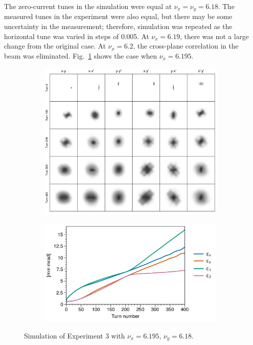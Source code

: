 The zero-current tunes in the simulation were equal at $\nu_x = \nu_y = 6.18$. The measured tunes in the experiment were also equal, but there may be some uncertainty in the measurement; therefore, simulation was repeated as the horizontal tune was varied in steps of 0.005. At $\nu_x = 6.19$, there was not a large change from the original case. At $\nu_x = 6.2$, the cross-plane correlation in the beam was eliminated. Fig.~\ref{fig:exp3_sim_nux6.195_nuy6.18} shows the case when $\nu_x = 6.195$. 
%
\begin{figure}[!p]
    \centering
    \begin{subfigure}{0.85\textwidth}
        \includegraphics[width=\textwidth]{Images/chapter5/exp3/sim_snapshots_nux6.195_nuy6.18.png}
    \end{subfigure}
    \vfill
    \vspace*{1.0cm}
    \vfill
    \begin{subfigure}{0.7\textwidth}
        \includegraphics[width=\textwidth]{Images/chapter5/exp3/sim_emittances_nux6.195_nuy6.18.png}
    \end{subfigure}
    \caption{Simulation of Experiment 3 with $\nu_x = 6.195$, $\nu_y = 6.18$.}
    \label{fig:exp3_sim_nux6.195_nuy6.18}
\end{figure}
